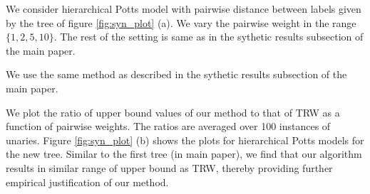 {{{{{{
  We consider hierarchical Potts model with pairwise distance between labels given by the tree of figure \ref{fig:syn_plot} (a). We vary the pairwise weight in the range $\{1, 2, 5, 10\}$. The rest of the setting is same as in the sythetic results subsection of the main paper.

 We use the same method as described in the sythetic results subsection of the main paper. 

 We plot the ratio of upper bound values of our method to that of TRW as a function of pairwise weights. The ratios are averaged over 100 instances of unaries. Figure \ref{fig:syn_plot} (b) shows the plots for hierarchical Potts models for the new tree. Similar to the first tree (in main paper), we find that our algorithm results in similar range of upper bound as TRW, thereby providing further empirical justification of our method.

}}}}}}
